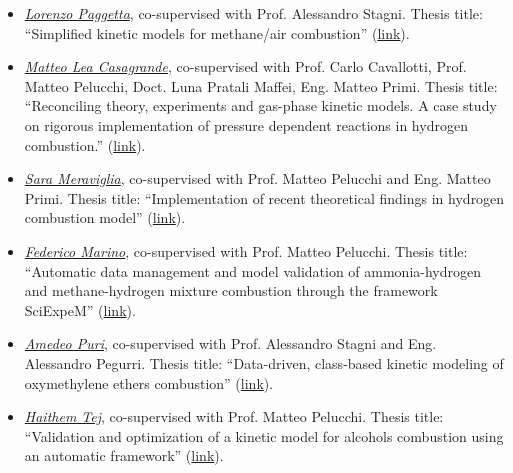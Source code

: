 
\begin{itemize}
    \item [ ] \ul{\it Lorenzo Paggetta}, co-supervised with Prof. Alessandro Stagni.
          Thesis title: ``Simplified kinetic models for methane/air combustion''
          (\href{https://hdl.handle.net/10589/230242}{link}).

    \item [ ] \ul{\it Matteo Lea Casagrande}, co-supervised with Prof. Carlo Cavallotti,
          Prof. Matteo Pelucchi, Doct. Luna Pratali Maffei, Eng. Matteo Primi. Thesis title:
          ``Reconciling theory, experiments and gas-phase kinetic models. A case study on
          rigorous implementation of pressure dependent reactions in hydrogen combustion.''
          (\href{https://hdl.handle.net/10589/226533}{link}).

    \item [ ] \ul{\it Sara Meraviglia}, co-supervised with Prof. Matteo Pelucchi and Eng.
          Matteo Primi. Thesis title: ``Implementation of recent theoretical findings in
          hydrogen combustion model'' (\href{https://hdl.handle.net/10589/214934}{link}).

    \item [ ] \ul{\it Federico Marino}, co-supervised with Prof. Matteo Pelucchi. Thesis
          title: ``Automatic data management and model validation of ammonia-hydrogen and
          methane-hydrogen mixture combustion through the framework SciExpeM''
          (\href{https://hdl.handle.net/10589/212616}{link}).

    \item [ ] \ul{\it Amedeo Puri}, co-supervised with Prof. Alessandro Stagni and Eng.
          Alessandro Pegurri. Thesis title: ``Data-driven, class-based kinetic modeling of
          oxymethylene ethers combustion'' (\href{https://hdl.handle.net/10589/206686}{link}).

    \item [ ] \ul{\it Haithem Tej}, co-supervised with Prof. Matteo Pelucchi. Thesis title:
          ``Validation and optimization of a kinetic model for alcohols combustion using an
          automatic framework'' (\href{https://hdl.handle.net/10589/210401}{link}).

\end{itemize}
